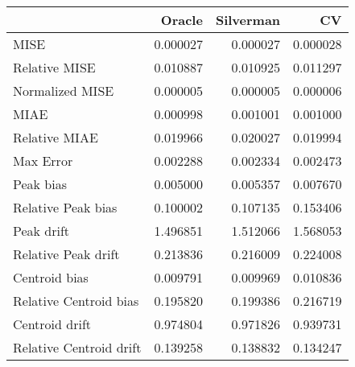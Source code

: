 \begin{tabular}{lrrr}
  \hline
 & Oracle & Silverman & CV \\ 
  \hline
MISE & 0.000027 & 0.000027 & 0.000028 \\ 
  Relative MISE & 0.010887 & 0.010925 & 0.011297 \\ 
  Normalized MISE & 0.000005 & 0.000005 & 0.000006 \\ 
  MIAE & 0.000998 & 0.001001 & 0.001000 \\ 
  Relative MIAE & 0.019966 & 0.020027 & 0.019994 \\ 
  Max Error & 0.002288 & 0.002334 & 0.002473 \\ 
  Peak bias & 0.005000 & 0.005357 & 0.007670 \\ 
  Relative Peak bias & 0.100002 & 0.107135 & 0.153406 \\ 
  Peak drift & 1.496851 & 1.512066 & 1.568053 \\ 
  Relative Peak drift & 0.213836 & 0.216009 & 0.224008 \\ 
  Centroid bias & 0.009791 & 0.009969 & 0.010836 \\ 
  Relative Centroid bias & 0.195820 & 0.199386 & 0.216719 \\ 
  Centroid drift & 0.974804 & 0.971826 & 0.939731 \\ 
  Relative Centroid drift & 0.139258 & 0.138832 & 0.134247 \\ 
   \hline
\end{tabular}

